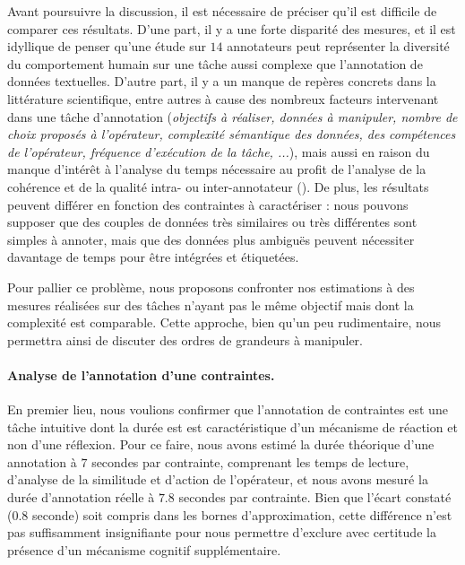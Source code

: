 		\begin{leftBarAuthorOpinion}
			Avant poursuivre la discussion, il est nécessaire de préciser qu'il est difficile de comparer ces résultats.
			D'une part, il y a une forte disparité des mesures, et il est idyllique de penser qu'une étude sur $14$ annotateurs peut représenter la diversité du comportement humain sur une tâche aussi complexe que l'annotation de données textuelles.
			D'autre part, il y a un manque de repères concrets dans la littérature scientifique, entre autres à cause des nombreux facteurs intervenant dans une tâche d'annotation (\textit{objectifs à réaliser, données à manipuler, nombre de choix proposés à l'opérateur, complexité sémantique des données, des compétences de l'opérateur, fréquence d'exécution de la tâche, ...}), mais aussi en raison du manque d'intérêt à l'analyse du temps nécessaire au profit de l'analyse de la cohérence et de la qualité intra- ou inter-annotateur (\cite{baledent:2022:complexite-annotation-manuelle}).
			De plus, les résultats peuvent différer en fonction des contraintes à caractériser : nous pouvons supposer que des couples de données très similaires ou très différentes sont simples à annoter, mais que des données plus ambiguës peuvent nécessiter davantage de temps pour être intégrées et étiquetées.
			
			Pour pallier ce problème, nous proposons confronter nos estimations à des mesures réalisées sur des tâches n'ayant pas le même objectif mais dont la complexité est comparable.
			Cette approche, bien qu'un peu rudimentaire, nous permettra ainsi de discuter des ordres de grandeurs à manipuler.
		\end{leftBarAuthorOpinion}
		
		
		\paragraph{Analyse de l'annotation d'une contraintes.}
		
			En premier lieu, nous voulions confirmer que l'annotation de contraintes est une tâche intuitive dont la durée est est caractéristique d'un mécanisme de réaction et non d'une réflexion.
			Pour ce faire, nous avons estimé la durée théorique d'une annotation à $7$ secondes par contrainte, comprenant les temps de lecture, d'analyse de la similitude et d'action de l'opérateur, et nous avons mesuré la durée d'annotation réelle à $7.8$ secondes par contrainte.
			Bien que l'écart constaté ($0.8$ seconde) soit compris dans les bornes d'approximation, cette différence n'est pas suffisamment insignifiante pour nous permettre d'exclure avec certitude la présence d'un mécanisme cognitif supplémentaire.
				
